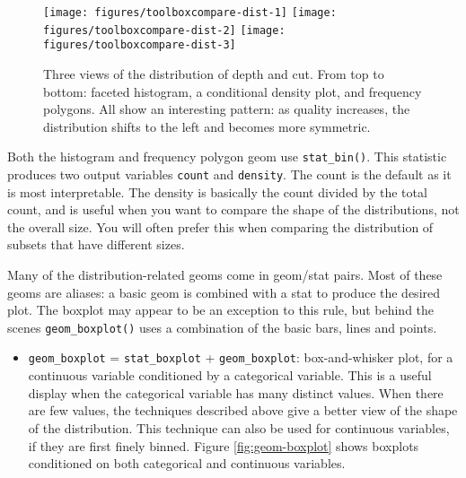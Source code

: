 \begin{figure}

{\centering \texttt{[image: figures/toolboxcompare-dist-1]} \texttt{[image: figures/toolboxcompare-dist-2]} \texttt{[image: figures/toolboxcompare-dist-3]} 

}

\caption{Three views of the distribution of depth and cut. From top to bottom: faceted histogram, a conditional density plot, and frequency polygons. All show an interesting pattern: as quality increases, the distribution shifts to the left and becomes more symmetric.\label{fig:compare-dist}}
\end{figure}

Both the histogram and frequency polygon geom use \texttt{stat\_bin()}.
This statistic produces two output variables \texttt{count} and
\texttt{density}. The count is the default as it is most interpretable.
The density is basically the count divided by the total count, and is
useful when you want to compare the shape of the distributions, not the
overall size. You will often prefer this when comparing the distribution
of subsets that have different sizes. 

Many of the distribution-related geoms come in geom/stat pairs. Most of
these geoms are aliases: a basic geom is combined with a stat to produce
the desired plot. The boxplot may appear to be an exception to this
rule, but behind the scenes \texttt{geom\_boxplot()} uses a combination
of the basic bars, lines and points.

\begin{itemize}
\itemsep1pt\parskip0pt
\item
  \texttt{geom\_boxplot} = \texttt{stat\_boxplot} +
  \texttt{geom\_boxplot}: box-and-whisker plot, for a continuous
  variable conditioned by a categorical variable. This is a useful
  display when the categorical variable has many distinct values. When
  there are few values, the techniques described above give a better
  view of the shape of the distribution. This technique can also be used
  for continuous variables, if they are first finely binned. Figure
  \ref{fig:geom-boxplot} shows boxplots conditioned on both categorical
  and continuous variables.  
\end{itemize}

\begin{Shaded}
\begin{Highlighting}[]
\NormalTok{)}
\NormalTok{, }
        \NormalTok{(}\NormalTok{, }\NormalTok{))}
\end{Highlighting}
\end{Shaded}

